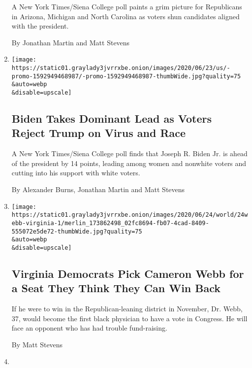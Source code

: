 \begin{enumerate}
  A New York Times/Siena College poll paints a grim picture for
  Republicans in Arizona, Michigan and North Carolina as voters shun
  candidates aligned with the president.

  By Jonathan Martin and Matt Stevens
\item
  \href{/2020/06/24/us/politics/trump-biden-poll-nyt-upshot-siena-college.html}{}

  \texttt{[image: https://static01.graylady3jvrrxbe.onion/images/2020/06/23/us/-promo-1592949468987/-promo-1592949468987-thumbWide.jpg?quality=75\\\&auto=webp\\\&disable=upscale]}

  \hypertarget{biden-takes-dominant-lead-as-voters-reject-trump-on-virus-and-race}{%
  \subsection{Biden Takes Dominant Lead as Voters Reject Trump on Virus
  and
  Race}\label{biden-takes-dominant-lead-as-voters-reject-trump-on-virus-and-race}}

  A New York Times/Siena College poll finds that Joseph R. Biden Jr. is
  ahead of the president by 14 points, leading among women and nonwhite
  voters and cutting into his support with white voters.

  By Alexander Burns, Jonathan Martin and Matt Stevens
\item
  \href{/2020/06/24/us/politics/cameron-webb-wins-virginia.html}{}

  \texttt{[image: https://static01.graylady3jvrrxbe.onion/images/2020/06/24/world/24webb-virginia-1/merlin\_173862498\_02fc8694-fb07-4cad-8409-555072e5de72-thumbWide.jpg?quality=75\\\&auto=webp\\\&disable=upscale]}

  \hypertarget{virginia-democrats-pick-cameron-webb-for-a-seat-they-think-they-can-win-back}{%
  \subsection{Virginia Democrats Pick Cameron Webb for a Seat They Think
  They Can Win
  Back}\label{virginia-democrats-pick-cameron-webb-for-a-seat-they-think-they-can-win-back}}

  If he were to win in the Republican-leaning district in November, Dr.
  Webb, 37, would become the first black physician to have a vote in
  Congress. He will face an opponent who has had trouble fund-raising.

  By Matt Stevens
\item
  \href{/2020/06/22/us/politics/trump-vs-biden-presidential-debates.html}{}


\end{enumerate}
